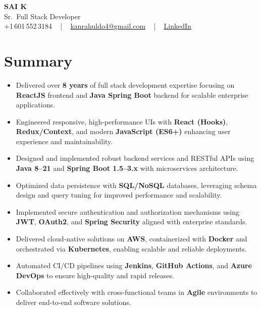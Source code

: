 \documentclass[letterpaper,11pt]{article}
\newcommand{\resumeItem}[1]{
  \item\footnotesize{
    {#1 \vspace{-2pt}}
  }
}
\newcommand{\resumeItemListStart}{\begin{itemize}[leftmargin=*]}
\newcommand{\resumeItemListEnd}{\end{itemize}\vspace{-5pt}}
\begin{document}
\begin{center}
    {\fontsize{14pt}{12pt}\selectfont \textbf{\MakeUppercase{Sai K}}}\\ \vspace{2pt}
    \fontsize{10pt}{12pt}\selectfont Sr.\ Full Stack Developer\\ \vspace{2pt}
    \fontsize{10pt}{12pt}\selectfont +1\,601\,552\,3184 ~ | ~
    \href{mailto:kanrahuldo4@gmail.com}{kanrahuldo4@gmail.com} ~ | ~
    \href{https://www.linkedin.com/in/srrrk/}{\color{blue}\underline{LinkedIn}}
    \vspace{-10pt}
\end{center}

\section{Summary}
\fontsize{9pt}{10pt}\selectfont
\resumeItemListStart
  \resumeItem{Delivered over \textbf{8 years} of full stack development expertise focusing on \textbf{ReactJS} frontend and \textbf{Java Spring Boot} backend for scalable enterprise applications.}
  \resumeItem{Engineered responsive, high-performance UIs with \textbf{React (Hooks)}, \textbf{Redux/Context}, and modern \textbf{JavaScript (ES6+)} enhancing user experience and maintainability.}
  \resumeItem{Designed and implemented robust backend services and RESTful APIs using \textbf{Java 8--21} and \textbf{Spring Boot 1.5--3.x} with microservices architecture.}
  \resumeItem{Optimized data persistence with \textbf{SQL/NoSQL} databases, leveraging schema design and query tuning for improved performance and scalability.}
  \resumeItem{Implemented secure authentication and authorization mechanisms using \textbf{JWT}, \textbf{OAuth2}, and \textbf{Spring Security} aligned with enterprise standards.}
  \resumeItem{Delivered cloud-native solutions on \textbf{AWS}, containerized with \textbf{Docker} and orchestrated via \textbf{Kubernetes}, enabling scalable and reliable deployments.}
  \resumeItem{Automated CI/CD pipelines using \textbf{Jenkins}, \textbf{GitHub Actions}, and \textbf{Azure DevOps} to ensure high-quality and rapid releases.}
  \resumeItem{Collaborated effectively with cross-functional teams in \textbf{Agile} environments to deliver end-to-end software solutions.}
\resumeItemListEnd
\vspace{-6pt}

\end{document}
